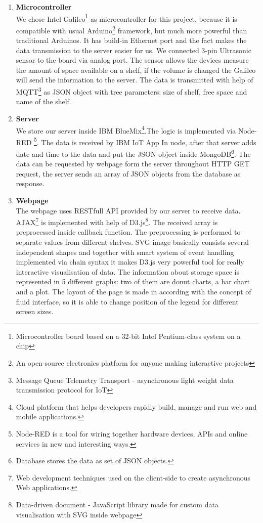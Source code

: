 \documentclass[english]{article}
\begin{document}
\begin{enumerate}
\item \textbf{Microcontroller}\\
We chose Intel Galileo\footnote{Microcontroller board based on a 32-bit Intel Pentium-class system on a chip} as microcontroller for this project, because it is compatible with usual Arduino\footnote{An open-source electronics platform for anyone making interactive projects} framework, but much more powerful than traditional Arduinos. It has build-in Ethernet port and the fact makes the data transmission to the server easier for us. We connected 3-pin Ultrasonic sensor to the board via analog port. The sensor allows the devices measure the amount of space available on a shelf, if the volume is changed the Galileo will send the information to the server. The data is transmitted with help of MQTT\footnote{Message Queue Telemetry Transport - asynchronous light weight data transmission protocol for IoT} as JSON object with tree parameters: size of shelf, free space and name of the shelf.
\item \textbf{Server}\\
We store our server inside IBM BlueMix\footnote{Cloud platform that helps developers rapidly build, manage and run web and mobile applications.}.The logic is implemented via Node-RED
\footnote{Node-RED is a tool for wiring together hardware devices, APIs and online services in new and interesting ways.}. The data is received by IBM IoT App In node, after that server adds date and time to the data and put the JSON object inside MongoDB\footnote{Database stores the data as set of JSON objects.}. The data can be requested by webpage form the server throughout HTTP GET request, the server sends an array of JSON objects from the database as response.
\item \textbf{Webpage}\\
The webpage uses RESTfull API provided by our server to receive data. AJAX\footnote{Web development techniques used on the client-side to create asynchronous Web applications.} is implemented with help of D3.js\footnote{Data-driven document - JavaScript library made for custom data visualisation with SVG inside webpage}. The received array is preprocessed inside callback function. The preprocessing is performed to separate values from different shelves. SVG image basically consists several independent shapes and together with smart system of event handling implemented via chain syntax it makes D3.js very powerful tool for really interactive visualisation of data. The information about storage space is represented in 5 different graphs: two of them are donut charts, a bar chart and a plot.
The layout of the page is made in according with the concept of fluid interface, so it is able to change position of the legend for different screen sizes.
\end{enumerate}
\end{document}
